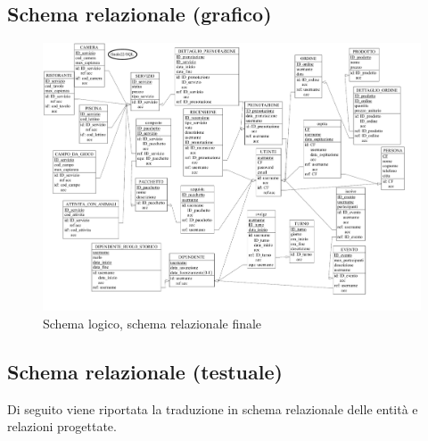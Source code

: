 \documentclass[a4paper,12pt]{report}
\begin{document}
\subsection{Schema relazionale (grafico)}
\begin{figure}[H]
	\centering
	\includegraphics[width=\textwidth, trim=0 25pt 25pt 0 , clip]{./pdf/finale logico.pdf}
	\caption{Schema logico, schema relazionale finale}
	\label{fig:schema-logico}
\end{figure}

\subsection{Schema relazionale (testuale)}
Di seguito viene riportata la traduzione in schema relazionale delle entità e relazioni progettate.
\end{document}
